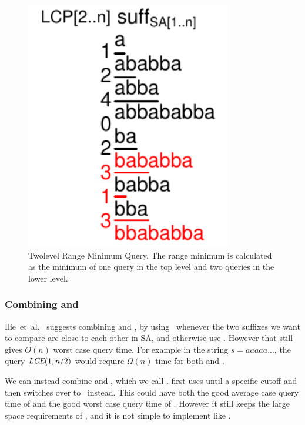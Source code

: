 \documentclass[a4]{article}
\begin{document}
\begin{figure}[tp]
    \begin{center}
        \includegraphics[width=0.8\textwidth,page=2]{sa+lcp+min.pdf}
    \end{center}
    \caption{\label{fig:sa+lcp+min-twolevel}Twolevel Range Minimum Query. The range minimum is calculated as the minimum of one query in the top level and two queries in the lower level.}
\end{figure}

\subsubsection{Combining  and \label{sec:dc-lcprmq}}

Ilie~et~al.~\cite{ilie-navarro-tinta} suggests combining  and \RMQn, by using \RMQn\ whenever the two suffixes we want to compare are close to each other in SA, and otherwise use . However that still gives $O(n)$ worst case query time. For example in the string $s=aaaaa...$, the query $\textit{LCE}(1,n/2)$ would require $\Omega(n)$ time for both  and \RMQn.

We can instead combine  and \RMQq, which we call .  first uses  until a specific cutoff and then switches over to \RMQq\ instead. This could have both the good average case query time of  and the good worst case query time of . However it still keeps the large space requirements of , and it is not simple to implement like .
\end{document}
